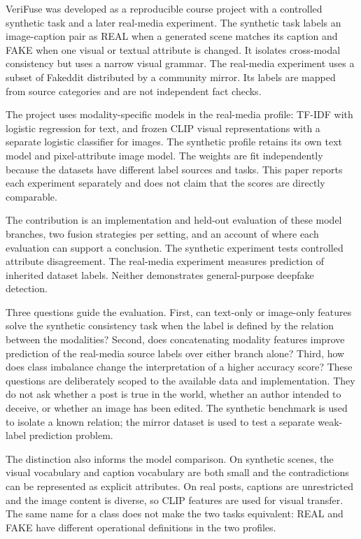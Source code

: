 \documentclass[conference]{IEEEtran}
\begin{document}
VeriFuse was developed as a reproducible course project with a controlled synthetic task and a later real-media experiment. The synthetic task labels an image-caption pair as REAL when a generated scene matches its caption and FAKE when one visual or textual attribute is changed. It isolates cross-modal consistency but uses a narrow visual grammar. The real-media experiment uses a subset of Fakeddit distributed by a community mirror. Its labels are mapped from source categories and are not independent fact checks.

The project uses modality-specific models in the real-media profile: TF-IDF with logistic regression for text, and frozen CLIP visual representations with a separate logistic classifier for images. The synthetic profile retains its own text model and pixel-attribute image model. The weights are fit independently because the datasets have different label sources and tasks. This paper reports each experiment separately and does not claim that the scores are directly comparable.

The contribution is an implementation and held-out evaluation of these model branches, two fusion strategies per setting, and an account of where each evaluation can support a conclusion. The synthetic experiment tests controlled attribute disagreement. The real-media experiment measures prediction of inherited dataset labels. Neither demonstrates general-purpose deepfake detection.

Three questions guide the evaluation. First, can text-only or image-only features solve the synthetic consistency task when the label is defined by the relation between the modalities? Second, does concatenating modality features improve prediction of the real-media source labels over either branch alone? Third, how does class imbalance change the interpretation of a higher accuracy score? These questions are deliberately scoped to the available data and implementation. They do not ask whether a post is true in the world, whether an author intended to deceive, or whether an image has been edited. The synthetic benchmark is used to isolate a known relation; the mirror dataset is used to test a separate weak-label prediction problem.

The distinction also informs the model comparison. On synthetic scenes, the visual vocabulary and caption vocabulary are both small and the contradictions can be represented as explicit attributes. On real posts, captions are unrestricted and the image content is diverse, so CLIP features are used for visual transfer. The same name for a class does not make the two tasks equivalent: REAL and FAKE have different operational definitions in the two profiles.
\end{document}

